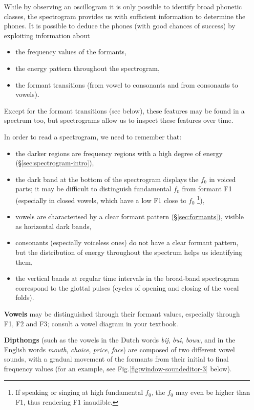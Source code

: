 \documentclass[
]{book}
\begin{document}
While by observing an oscillogram it is only possible to identify broad phonetic classes, the spectrogram provides us with sufficient information to determine the phones. It is possible to deduce the phones (with good chances of success) by exploiting information about

\begin{itemize}
\item
  the frequency values of the formants,
\item
  the energy pattern throughout the spectrogram,
\item
  the formant transitions (from vowel to consonants and from consonants to vowels).
\end{itemize}

Except for the formant transitions (see below), these features may be found in a spectrum too, but spectrograms allow us to inspect these features over time.

In order to read a spectrogram, we need to remember that:

\begin{itemize}
\item
  the darker regions are frequency regions with a high degree of energy (§\ref{sec:spectrogram-intro}),
\item
  the dark band at the bottom of the spectrogram displays the \(f_0\) in voiced parts; it may be difficult to distinguish fundamental \(f_0\) from formant F1 (especially in closed vowels, which have a low F1 close to \(f_0\) \footnote{If speaking or singing at high fundamental \(f_0\), the \(f_0\) may even be higher than F1, thus rendering F1 inaudible.}),
\item
  vowels are characterised by a clear formant pattern (§\ref{sec:formants}), visible as horizontal dark bands,
\item
  consonants (especially voiceless ones) do not have a clear formant pattern, but the distribution of energy throughout the spectrum helps us identifying them,
\item
  the vertical bands at regular time intervals in the broad-band spectrogram correspond to the glottal pulses (cycles of opening and closing of the vocal folds).
\end{itemize}

\textbf{Vowels} may be distinguished through their formant values, especially through F1, F2 and F3; consult a vowel diagram in your textbook.

\textbf{Dipthongs} (such as the vowels in the Dutch words \emph{bij}, \emph{bui}, \emph{bouw}, and in the English words \emph{mouth}, \emph{choice}, \emph{price}, \emph{face}) are composed of two different vowel sounds, with a gradual movement of the formants from their initial to final frequency values (for an example, see Fig.\ref{fig:window-soundeditor-3} below).
\end{document}

